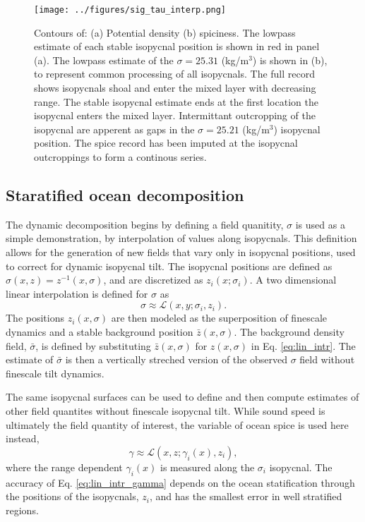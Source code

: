 \documentclass[preprint,NumberedRefs]{JASA}
\begin{document}
\begin{figure}
\texttt{[image: ../figures/sig\_tau\_interp.png]}
    \caption{\label{fig:cntrs}{Contours of: (a) Potential density (b) spiciness. The lowpass estimate of each stable isopycnal position is shown in red in panel (a). The lowpass estimate of the $\sigma=25.31$ (kg/m$^3$) is shown in (b), to represent common processing of all isopycnals. The full record shows isopycnals shoal and enter the mixed layer with decreasing range. The stable isopycnal estimate ends at the first location the isopycnal enters the mixed layer. Intermittant outcropping of the isopycnal are apperent as gaps in the $\sigma=25.21$ (kg/m$^3$) isopycnal position. The spice record has been imputed at the isopycnal outcroppings to form a continous series.}}
\end{figure}

\subsection{Staratified ocean decomposition}
The dynamic decomposition begins by defining a field quanitity, $\sigma$ is used as a simple demonstration, by interpolation of values along isopycnals. This definition allows for the generation of new fields that vary only in isopycnal positions, used to correct for dynamic isopycnal tilt. The isopycnal positions are defined as $\sigma(x, z) = z^{-1}(x, \sigma)$, and are discretized as $z_i(x; \sigma_i)$. A two dimensional linear interpolation is defined for $\sigma$ as
\begin{equation}
    \sigma\approx\mathcal{L}(x, y; \sigma_i, z_i).
    \label{eq:lin_intr}
\end{equation}
The positions $z_i(x, \sigma)$ are then modeled as the superposition of finescale dynamics and a stable background position $\bar{z}(x, \sigma)$. The background density field, $\bar{\sigma}$, is defined by substituting $\bar{z}(x, \sigma)$ for $z(x, \sigma)$ in Eq. \eqref{eq:lin_intr}. The estimate of $\bar{\sigma}$ is then a vertically streched version of the observed $\sigma$ field without finescale tilt dynamics.

The same isopycnal surfaces can be used to define and then compute estimates of other field quantites without finescale isopycnal tilt. While sound speed is ultimately the field quantity of interest, the variable of ocean spice is used here instead,
\begin{equation}
    \gamma\approx\mathcal{L}(x, z; \gamma_i(x), z_i),
    \label{eq:lin_intr_gamma}
\end{equation}
where the range dependent $\gamma_i(x)$ is measured along the $\sigma_i$ isopycnal. The accuracy of Eq. \eqref{eq:lin_intr_gamma} depends on the ocean statification through the positions of the isopycnals, $z_i$, and has the smallest error in well stratified regions.
\end{document}
